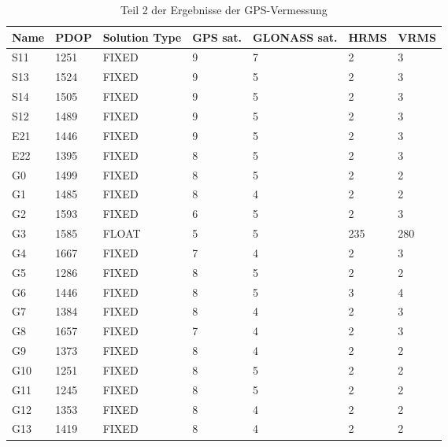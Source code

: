 \begin{table}[!ht]
\centering
\caption{Teil 2 der Ergebnisse der GPS-Vermessung}
\label{tab:gps2}
\begin{tabular}{lllllll}
\toprule
Name    & PDOP & Solution Type      & GPS sat. & GLONASS sat. & HRMS & VRMS \\
\midrule
S11     & 1251 & FIXED & 9              & 7                  & 2    & 3    \\
S13     & 1524 & FIXED & 9              & 5                  & 2    & 3    \\
S14     & 1505 & FIXED & 9              & 5                  & 2    & 3    \\
S12     & 1489 & FIXED & 9              & 5                  & 2    & 3    \\
E21     & 1446 & FIXED & 9              & 5                  & 2    & 3    \\
E22     & 1395 & FIXED & 8              & 5                  & 2    & 3    \\
G0      & 1499 & FIXED & 8              & 5                  & 2    & 2    \\
G1      & 1485 & FIXED & 8              & 4                  & 2    & 2    \\
G2      & 1593 & FIXED & 6              & 5                  & 2    & 3    \\
G3      & 1585 & FLOAT & 5              & 5                  & 235  & 280  \\
G4      & 1667 & FIXED & 7              & 4                  & 2    & 3    \\
G5      & 1286 & FIXED & 8              & 5                  & 2    & 2    \\
G6      & 1446 & FIXED & 8              & 5                  & 3    & 4    \\
G7      & 1384 & FIXED & 8              & 4                  & 2    & 3    \\
G8      & 1657 & FIXED & 7              & 4                  & 2    & 3    \\
G9      & 1373 & FIXED & 8              & 4                  & 2    & 2    \\
G10     & 1251 & FIXED & 8              & 5                  & 2    & 2    \\
G11     & 1245 & FIXED & 8              & 5                  & 2    & 2    \\
G12     & 1353 & FIXED & 8              & 4                  & 2    & 2    \\
G13     & 1419 & FIXED & 8              & 4                  & 2    & 2    \\

\end{tabular}
\end{table}

